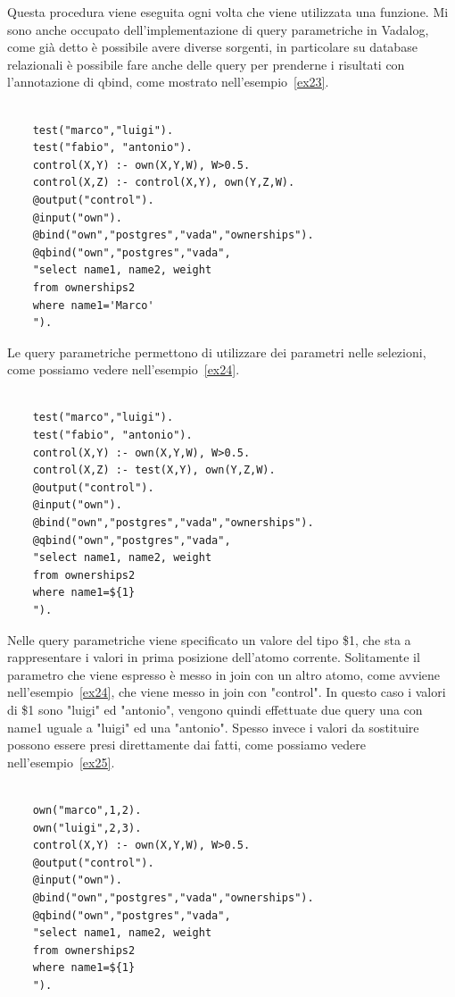 Questa procedura viene eseguita ogni volta che viene utilizzata una funzione. \newline \newline
Mi sono anche occupato dell'implementazione di query parametriche in Vadalog, come già detto è possibile avere diverse sorgenti, in particolare su database relazionali è possibile fare anche delle query per prenderne i risultati con l'annotazione di qbind, come mostrato nell'esempio~\ref{ex23}.
\begin{example}\label{ex23}
\normalfont
{}
	\begin{lstlisting}
		
	test("marco","luigi").
	test("fabio", "antonio").
	control(X,Y) :- own(X,Y,W), W>0.5.
	control(X,Z) :- control(X,Y), own(Y,Z,W).
	@output("control").
	@input("own").
	@bind("own","postgres","vada","ownerships").
	@qbind("own","postgres","vada",
	"select name1, name2, weight 
	from ownerships2
	where name1='Marco'
	").
	\end{lstlisting}
\end{example}
Le query parametriche permettono di utilizzare dei parametri nelle selezioni, come possiamo vedere nell'esempio~\ref{ex24}.
\begin{example}\label{ex24}
	\normalfont
	\begin{lstlisting}
	
	test("marco","luigi").
	test("fabio", "antonio").
	control(X,Y) :- own(X,Y,W), W>0.5.
	control(X,Z) :- test(X,Y), own(Y,Z,W).
	@output("control").
	@input("own").
	@bind("own","postgres","vada","ownerships").
	@qbind("own","postgres","vada",
	"select name1, name2, weight 
	from ownerships2
	where name1=${1}
	").
	\end{lstlisting}
\end{example}
Nelle query parametriche viene specificato un valore del tipo \${1}, che sta a rappresentare i valori in prima posizione dell'atomo corrente. Solitamente il parametro che viene espresso è messo in join con un altro atomo, come avviene nell'esempio~\ref{ex24}, che viene messo in join con "control". In questo caso i valori di \${1} sono "luigi" ed "antonio", vengono quindi effettuate due query una con name1 uguale a "luigi" ed una "antonio". \newline
Spesso invece i valori da sostituire possono essere presi direttamente dai fatti, come possiamo vedere nell'esempio~\ref{ex25}.
\begin{example}\label{ex25}
	\normalfont
	\begin{lstlisting}
	
	own("marco",1,2).
	own("luigi",2,3).
	control(X,Y) :- own(X,Y,W), W>0.5.
	@output("control").
	@input("own").
	@bind("own","postgres","vada","ownerships").
	@qbind("own","postgres","vada",
	"select name1, name2, weight 
	from ownerships2
	where name1=${1}
	").
	\end{lstlisting}
\end{example}
